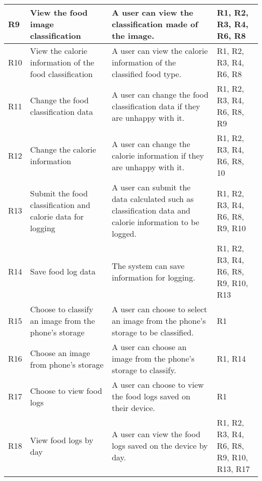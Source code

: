 \begin{longtable}{|p{.75cm}|p{3.5cm}|p{6cm}|p{2.5cm}|}
R9          & View the food image classification                          & A user can view the classification made of the image.                                                   & R1, R2, R3, R4, R6, R8                         \\ \hline
R10         & View the calorie information of the food classification     & A user can view the calorie information of the classified food type.                                    & R1, R2, R3, R4, R6, R8                         \\ \hline
R11         & Change the food classification data                         & A user can change the food classification data if they are unhappy with it.                             & R1, R2, R3, R4, R6, R8, R9                     \\ \hline
R12         & Change the calorie information                              & A user can change the calorie information if they are unhappy with it.                                  & R1, R2, R3, R4, R6, R8, 10                     \\ \hline
R13         & Submit the food classification and calorie data for logging & A user can submit the data calculated such as classification data and calorie information to be logged. & R1, R2, R3, R4, R6, R8, R9, R10                \\ \hline
R14         & Save food log data                                          & The system can save information for logging.                                                            & R1, R2, R3, R4, R6, R8, R9, R10, R13           \\ \hline
R15         & Choose to classify an image from the phone's storage        & A user can choose to select an image from the phone's storage to be classified.                         & R1                                             \\ \hline
R16         & Choose an image from phone's storage                        & A user can choose an image from the phone's storage to classify.                                        & R1, R14                                        \\ \hline
R17         & Choose to view food logs                                    & A user can choose to view the food logs saved on their device.                                          & R1                                             \\ \hline
R18         & View food logs by day                                       & A user can view the food logs saved on the device by day.                                               & R1, R2, R3, R4, R6, R8, R9, R10, R13, R17      \\ \hline

\end{longtable}
